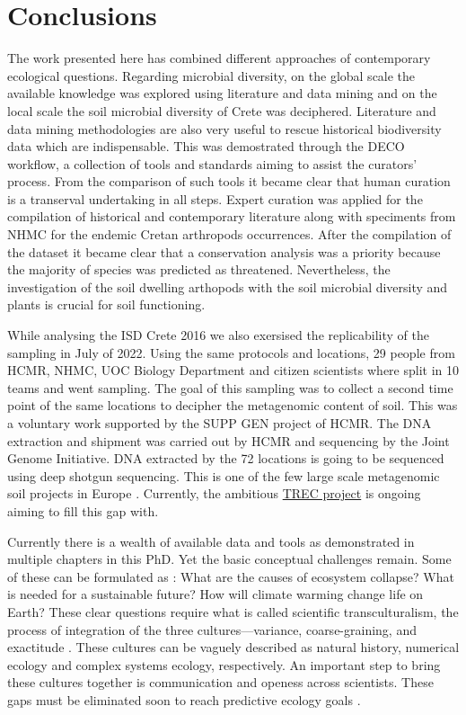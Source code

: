 % 
% 

\chapter{Conclusions}
\label{cha:conclusions}

The work presented here has combined different approaches of contemporary 
ecological questions. Regarding microbial diversity, on the global scale the available 
knowledge was explored using literature and data mining and on the local scale
the soil microbial diversity of Crete was deciphered. Literature and data mining 
methodologies are also very useful to rescue historical biodiversity data which are
indispensable. This was demostrated through the DECO workflow, a collection
of tools and standards aiming to assist the curators' process. From the comparison
of such tools it became clear that human curation is a transerval undertaking in all steps.
Expert curation was applied for the compilation of historical and contemporary
literature along with speciments from NHMC for the endemic Cretan arthropods occurrences.
After the compilation of the dataset it became clear that a conservation analysis
was a priority because the majority of species was predicted as threatened.
Nevertheless, the investigation of the soil dwelling arthopods with the soil microbial diversity
and plants is crucial for soil functioning. 

While analysing the ISD Crete 2016 we also exersised the replicability of the sampling in July of 2022.
Using the same protocols and locations, 29 people from HCMR, NHMC, UOC Biology
Department and citizen scientists where split in 10 teams and went sampling. 
The goal of this sampling was to collect a second time point of the same locations
to decipher the metagenomic content of soil. This was a voluntary work supported 
by the SUPP GEN project of HCMR. The DNA extraction and shipment was carried out 
by HCMR and sequencing by the Joint Genome Initiative. DNA extracted by the 72 locations 
is going to be sequenced using deep shotgun sequencing. This is one of the few large scale metagenomic soil projects in
Europe \parencite{nayfach2021a-genomic, ma2023a-genomic}. Currently, 
the ambitious \href{https://www.embl.org/about/info/trec/}{TREC project} is
ongoing aiming to fill this gap with.

Currently there is a wealth of available data and tools as demonstrated in 
multiple chapters in this PhD. Yet the basic conceptual challenges remain. 
Some of these can be formulated as : What are the causes of ecosystem collapse?
What is needed for a sustainable future?
How will climate warming change life on Earth?
These clear questions require what is called scientific transculturalism,
the process of integration of the three cultures—variance, coarse-graining, and exactitude \parencite{Enquist_2024}.
These cultures can be vaguely described as natural history, numerical ecology and complex systems ecology, respectively.
An important step to bring these cultures together is communication and openess across scientists.
These gaps must be eliminated soon to reach predictive ecology goals \parencite{mouquet_review_2015}.
